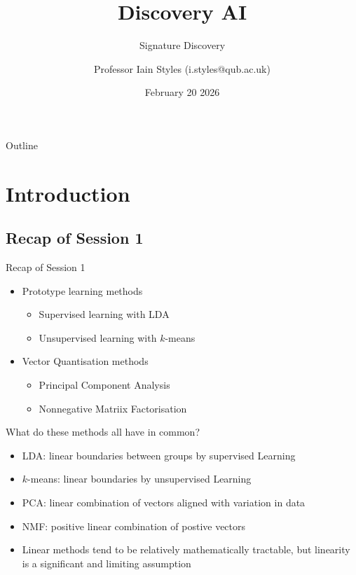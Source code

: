 \documentclass[aspectratio=169]{beamer}
\begin{document}
    \title{Discovery AI}
    \subtitle{Signature Discovery}
    \author{Professor Iain Styles (i.styles@qub.ac.uk)}
    \date{February 20 2026}

\begin{frame}
  \titlepage
\end{frame}

\begin{frame}{Outline}
  \tableofcontents
\end{frame}

\section{Introduction}

\subsection{Recap of Session 1}
\begin{frame}{Recap of Session 1}
  \begin{itemize}
    \item Prototype learning methods
    \begin{itemize}
      \item Supervised learning with LDA
      \item Unsupervised learning with $k$-means 
    \end{itemize}
    \item Vector Quantisation methods
    \begin{itemize}
      \item Principal Component Analysis
      \item Nonnegative Matriix Factorisation
    \end{itemize}
    
  \end{itemize}
\end{frame}

\begin{frame}{What do these methods all have in common?}
  \begin{itemize}
    \item LDA: linear boundaries between groups by supervised Learning
    \item $k$-means: linear boundaries by unsupervised Learning
    \item PCA: linear combination of vectors aligned with variation in data
    \item NMF: positive linear combination of postive vectors
    \pause
    \item Linear methods tend to be relatively mathematically tractable, but linearity is a significant and limiting assumption
  \end{itemize}
\end{frame}
\end{document}
